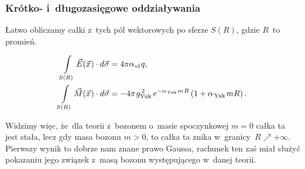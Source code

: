 \documentclass[10pt,t]{beamer}
\begin{document}
\begin{frame}
  \frametitle{Krótko- i~długozasięgowe oddziaływania}


  Łatwo obliczamy całki z~tych pól wektorowych po sferze $S( R )$, gdzie
  $R$~to promień.

  \vspace{-1.5em}


  \begin{subequations}

    \begin{align}
      \label{eq:Glowne-rodzaje-problemow-podczerwonych-07-A}
      \int\limits_{ S( R ) } \vec{E}( \vec{x} \hspace{0.05em} ) \cdot d\vec{ \sigma }
      &= 4 \pi \alpha_{ \hspace{0.09em} \text{el} } \hspace{0.09em} q, \\
      \label{eq:Glowne-rodzaje-problemow-podczerwonych-07-B}
      \int\limits_{ S( R ) } \vec{ M }( \vec{x} \hspace{0.05em} ) \cdot d\vec{ \sigma }
      &=
        -4 \pi \hspace{0.07em} g_{ \text{Yuk} }^{ \, 2 } \,
        e^{ -\alpha_{ \hspace{0.09em} \text{Yuk} } \hspace{0.09em} m \hspace{0.05em} R }
        \left( 1 + \alpha_{ \hspace{0.09em} \text{Yuk} } \hspace{0.09em} m R \right).
    \end{align}

  \end{subequations}

  \vspace{-1em}



  Widzimy więc, że~dla teorii z~bozonem o~masie spoczynkowej $m = 0$
  całka ta jest stała, lecz gdy masa bozonu $m > 0$, to całka ta znika
  w~granicy~$R \nearrow +\infty$. Pierwszy wynik to dobrze nam
  znane prawo Gaussa, rachunek ten zaś miał służyć pokazaniu jego związek
  z~masą bozonu występującego w~danej teorii.

\end{frame}
\end{document}
